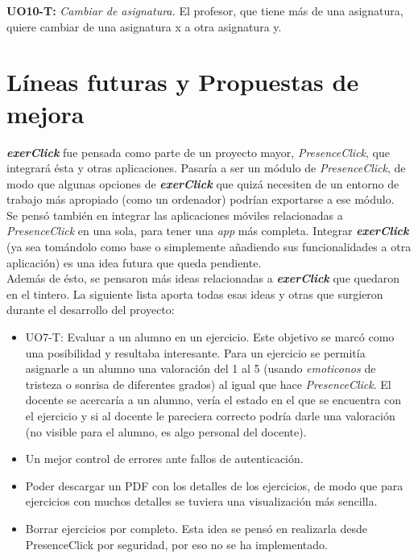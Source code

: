 \textbf{UO10-T:} \textit{Cambiar de asignatura.} El profesor, que tiene más de una asignatura, quiere cambiar de una asignatura x a otra asignatura y.\\

\section{Líneas futuras y Propuestas de mejora}

\textit{\textbf{exerClick}} fue pensada como parte de un proyecto mayor, \textit{PresenceClick}, que integrará ésta y otras aplicaciones. Pasaría a ser un módulo de \textit{PresenceClick}, de modo que algunas opciones de \textit{\textbf{exerClick}} que quizá necesiten de un entorno de trabajo más apropiado (como un ordenador) podrían exportarse a ese módulo.\\

Se pensó también en integrar las aplicaciones móviles relacionadas a \textit{PresenceClick} en una sola, para tener una \textit{app} más completa. Integrar \textit{\textbf{exerClick}} (ya sea tomándolo como base o simplemente añadiendo sus funcionalidades a otra aplicación) es una idea futura que queda pendiente.\\

Además de ésto, se pensaron más ideas relacionadas a \textit{\textbf{exerClick}} que quedaron en el tintero. La siguiente lista aporta todas esas ideas y otras que surgieron durante el desarrollo del proyecto:

\begin{itemize}
\item UO7-T: Evaluar a un alumno en un ejercicio. Este objetivo se marcó como una posibilidad y resultaba interesante. Para un ejercicio se permitía asignarle a un alumno una valoración del 1 al 5 (usando \textit{emoticonos} de tristeza o sonrisa de diferentes grados) al igual que hace \textit{PresenceClick}. El docente se acercaría a un alumno, vería el estado en el que se encuentra con el ejercicio y si al docente le pareciera correcto podría darle una valoración (no visible para el alumno, es algo personal del docente).

\item Un mejor control de errores ante fallos de autenticación.

\item Poder descargar un PDF con los detalles de los ejercicios, de modo que para ejercicios con muchos detalles se tuviera una visualización más sencilla.

\item Borrar ejercicios por completo. Esta idea se pensó en realizarla desde PresenceClick por seguridad, por eso no se ha implementado.
\end{itemize}

